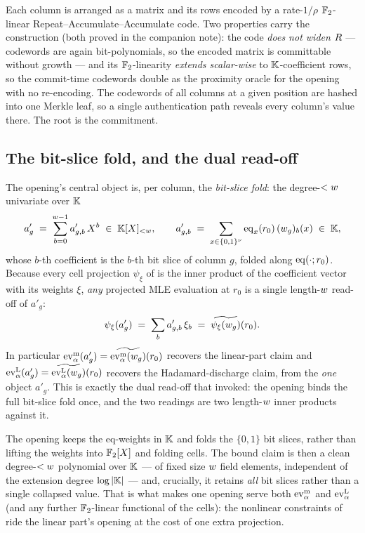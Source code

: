 Each column is arranged as a matrix and its rows encoded by a rate-$1/\rho$
$\mathbb{F}_2$-linear Repeat--Accumulate--Accumulate code. Two properties carry
the construction (both proved in the companion note): the code \emph{does
not widen} $R$ --- codewords are again bit-polynomials, so the
encoded matrix is committable without growth --- and its $\mathbb{F}_2$-linearity
\emph{extends scalar-wise} to $\mathbb{K}$-coefficient rows, so the commit-time
codewords double as the proximity oracle for the opening with no
re-encoding. The codewords of all columns at a given position are hashed
into one Merkle leaf, so a single authentication path reveals every
column's value there. The root is the commitment.

\subsection{The bit-slice fold, and the dual read-off}
\label{sec:bit-slice-fold}

The opening's central object is, per column, the \emph{bit-slice fold}: the
degree-$<w$ univariate over $\mathbb{K}$
\[
  a'_g \;=\; \sum_{b=0}^{w-1} a'_{g,b}\,X^b \;\in\; \mathbb{K}[X]_{<w},
  \qquad
  a'_{g,b} \;=\; \sum_{x\in\{0,1\}^{\nu}} \operatorname{eq}_x(r_0)\,(w_{g})_b(x)\;\in\;\mathbb{K},
\]
whose $b$-th coefficient is the $b$-th bit slice of column $g$, folded along
$\operatorname{eq}(\cdot;r_0)$. Because every cell projection $\psi_\xi$ of
 is the inner product of the coefficient vector with
its weights $\xi$, \emph{any} projected MLE evaluation at $r_0$ is a single
length-$w$ read-off of $a'_g$:
\[
  \psi_\xi(a'_g) \;=\; \sum_b a'_{g,b}\,\xi_b \;=\; \widetilde{\psi_\xi(w_g)}(r_0).
\]
In particular $\operatorname{ev}^{\mathrm{m}}_{\alpha}(a'_g)=\widetilde{\operatorname{ev}^{\mathrm{m}}_{\alpha}(w_g)}(r_0)$ recovers the linear-part
claim and $\operatorname{ev}^{\mathrm{L}}_{\alpha}(a'_g)=\widetilde{\operatorname{ev}^{\mathrm{L}}_{\alpha}(w_g)}(r_0)$ recovers the Hadamard-discharge
claim, from the \emph{one} object $a'_g$. This is exactly the dual read-off
that  invoked: the opening binds the full bit-slice
fold once, and the two readings are two length-$w$ inner products
against it.

\begin{remark}
\label{rem:why-bitsliced}
The opening keeps the eq-weights in $\mathbb{K}$ and folds the $\{0,1\}$ bit slices,
rather than lifting the weights into $\mathbb{F}_2[X]$ and folding cells. The bound
claim is then a clean degree-$<w$ polynomial over $\mathbb{K}$ --- of fixed size
$w$ field elements, independent of the extension degree $\log|\mathbb{K}|$ ---
and, crucially, it retains \emph{all} bit slices rather than a single
collapsed value. That is what makes one opening serve both $\operatorname{ev}^{\mathrm{m}}_{\alpha}$ and
$\operatorname{ev}^{\mathrm{L}}_{\alpha}$ (and any further $\mathbb{F}_2$-linear functional of the cells): the
nonlinear constraints of  ride the linear part's opening
at the cost of one extra projection.
\end{remark}

